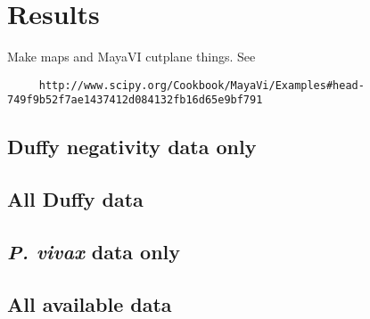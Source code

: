 \section*{Results}

Make maps and MayaVI cutplane things. See
\begin{verbatim}
     http://www.scipy.org/Cookbook/MayaVi/Examples#head-749f9b52f7ae1437412d084132fb16d65e9bf791
\end{verbatim}

\subsection*{Duffy negativity data only}

\subsection*{All Duffy data}

\subsection*{\emph{P. vivax} data only}

\subsection*{All available data}

